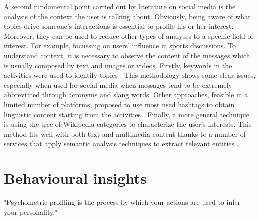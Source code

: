 A second fundamental point carried out by literature on social media is the analysis of the context the user is talking about.
Obviously, being aware of what topics drive someone's interactions is essential to profile his or her interest. 
Moreover, they can be used to reduce other types of analyses to a specific field of interest. For example, focussing on users' influence in sports discussions.
To understand context, it is necessary to observe the content of the messages which is usually composed by text and images or videos.
Firstly, keywords in the activities were used to identify topics \cite{cha2010measuring}. This methodology shows some clear issues, especially when used for social media when messages tend to be extremely abbreviated through acronyms and slang words.
Other approaches, feasible in a limited number of platforms, proposed to use most used hashtags to obtain linguistic content starting from the activities \cite{pennacchiotti2011machine}.
Finally, a more general technique is using the tree of Wikipedia categories to characterize the user's interests. 
This method fits well with both text and multimedia content thanks to a number of services that apply semantic analysis techniques to extract relevant entities \cite{torrero2018wikipedia}. 

\section{Behavioural insights}
"Psychometric profiling is the process by which your actions are used to infer your personality."

